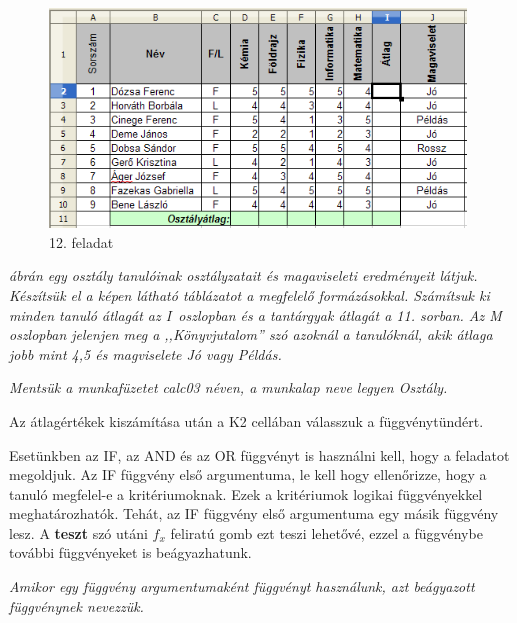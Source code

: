 \begin{figure}[!h]
\begin{center}
\includegraphics[width=11.048cm]{oocalcv1-img67.png}
\caption{12. feladat}\label{12-feladat}
\end{center}
\end{figure}

{\itshape
{} ábrán egy osztály tanulóinak osztályzatait és
magaviseleti eredményeit látjuk. Készítsük el a képen
látható táblázatot a megfelelő formázásokkal.
Számítsuk ki minden tanuló átlagát az I~oszlopban és a
tantárgyak átlagát a 11. sorban. Az M oszlopban jelenjen meg a
,,Könyvjutalom'' szó azoknál a
tanulóknál, akik átlaga jobb mint 4,5 és magviselete Jó vagy
Példás.}

{\itshape
Mentsük a munkafüzetet calc03 néven, a munkalap neve legyen
Osztály.}

Az átlagértékek kiszámítása után a K2 cellában
válasszuk a függvénytündért. 

Esetünkben az IF, az AND és az OR függvényt is használni kell,
hogy a feladatot megoldjuk. Az IF függvény első argumentuma, le
kell hogy ellenőrizze, hogy a tanuló megfelel-e a
kritériumoknak. Ezek a kritériumok logikai függvényekkel
meghatározhatók. Tehát, az IF függvény első argumentuma
egy másik függvény lesz. A \textbf{teszt} szó utáni
$f_x$ feliratú gomb
ezt teszi lehetővé, ezzel a függvénybe további
függvényeket is beágyazhatunk.

{\itshape
Amikor egy függvény argumentumaként függvényt használunk,
azt beágyazott függvénynek nevezzük.}

